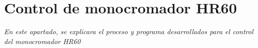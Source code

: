 \appendix

\chapter{Control de monocromador HR60}
\label{chap:monochromator}
\textit{En este apartado, se explicara el proceso y programa desarrollados para el control del monocromador HR60}
\vfill
\minitoc
\newpage